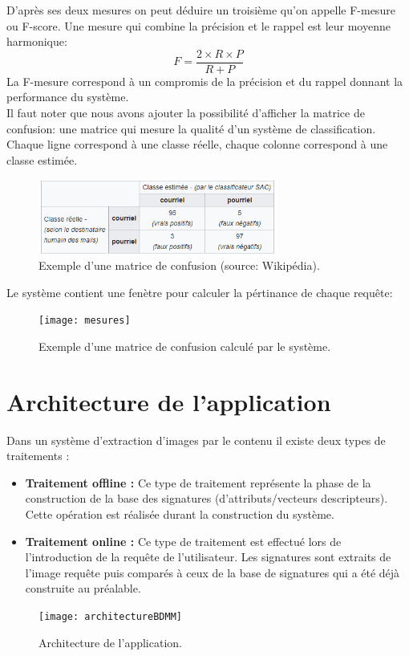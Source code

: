 D'après ses deux mesures on peut déduire un troisième qu'on appelle F-mesure ou F-score. Une mesure qui combine la précision et le rappel est leur moyenne harmonique:
\begin{equation}
F = \frac{2\times R\times P}{R + P} 
\end{equation}
La F-mesure correspond à un compromis de la précision et du rappel donnant la performance du système.\\

Il faut noter que nous avons ajouter la possibilité d'afficher la matrice de confusion: une matrice qui mesure la qualité d'un système de classification. Chaque ligne correspond à une classe réelle, chaque colonne correspond à une classe estimée. 
\begin{figure}[H]
	\centering
	\includegraphics[width=0.7\textwidth]{Figures/cm.png} 
	\caption{Exemple d'une matrice de confusion (source: Wikipédia).}
\end{figure}
Le système contient une fenètre pour calculer la pértinance de chaque requête:
\begin{figure}[H]
	\centering
	\texttt{[image: mesures]} 
	\caption{Exemple d'une matrice de confusion calculé par le système.}
\end{figure}
\section{Architecture de l’application}
Dans un système d’extraction d’images par le contenu il existe deux types de traitements :
\begin{itemize}
	\item \textbf{Traitement offline :}
	Ce type de traitement représente la phase de la construction de la base des signatures (d’attributs/vecteurs descripteurs).
	Cette opération est réalisée durant la construction du système.
	\item \textbf{Traitement online :}
	Ce type de traitement est effectué lors de l’introduction de la requête de l’utilisateur.
	Les signatures sont extraits de l’image requête puis comparés à ceux de la base de signatures qui a été déjà construite au préalable.
\end{itemize}
\begin{figure}[H]
	\centering
	\texttt{[image: architectureBDMM]} 
	\caption{Architecture de l’application.}
\end{figure}

